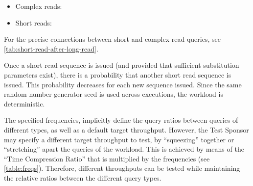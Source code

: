 \begin{itemize}
\item Complex reads:
\item Short reads:
\end{itemize}

For the precise connections between short and complex read queries, see \autoref{tab:short-read-after-long-read}.

Once a short read sequence is issued (and provided that sufficient substitution parameters 
exist), there is a probability that another short read sequence is issued. 
This probability decreases for each new sequence issued. 
Since the same random number generator seed is used across
executions, the workload is deterministic.



The specified frequencies, implicitly define the query ratios between queries
of different types, as well as a default target throughput. However, the Test
Sponsor may specify a different target throughput to test,  by ``squeezing''
together or ``stretching'' apart the queries of the workload. This is
achieved by means of the ``Time Compression Ratio'' that is multiplied by the
frequencies (see \autoref{table:freqs}).  Therefore, different
throughputs can be tested while maintaining the relative ratios between the
different query types.
